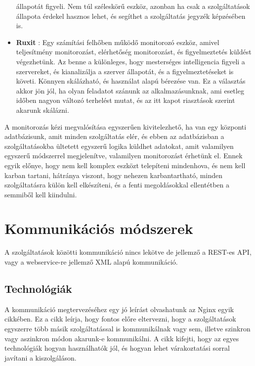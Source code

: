 \documentclass[11pt,magyar,a4paper,twoside,]{report}
\begin{document}
\begin{itemize}
  állapotát figyeli. Nem túl széleskörű eszköz, azonban ha csak a
  szolgáltatások állapota érdekel hasznos lehet, és segíthet a
  szolgáltatás jegyzék képzésében is.
\item
  \textbf{Ruxit}\citep{ruxit} \citep{ruxit-monitoring}: Egy számítási
  felhőben működő monitorozó eszköz, amivel teljesítmény monitorozást,
  elérhetőség monitorozást, és figyelmeztetés küldést végezhetünk. Az
  benne a különleges, hogy mesterséges intelligencia figyeli a
  szervereket, és kianalizálja a szerver állapotát, és a
  figyelmeztetéseket is követi. Könnyen skálázható, és használat alapú
  bérezése van. Ez a választás akkor jön jól, ha olyan feladatot szánunk
  az alkalmazásunknak, ami esetleg időben nagyon változó terhelést
  mutat, és az itt kapot riasztások szerint akarunk skálázni.
\end{itemize}

A monitorozás kézi megvalósítása egyszerűen kivitelezhető, ha van egy
központi adatbázisunk, amit minden szolgáltatás elér, és ebben az
adatbázisban a szolgáltatásokba ültetett egyszerű logika küldhet
adatokat, amit valamilyen egyszerű módszerrel megjelenítve, valamilyen
monitorozást érhetünk el. Ennek egyik előnye, hogy nem kell komplex
eszközt telepíteni mindenhova, és nem kell karban tartani, hátránya
viszont, hogy nehezen karbantartható, minden szolgáltatásra külön kell
elkészíteni, és a fenti megoldásokkal ellentétben a semmiből kell
kiindulni.

\section{Kommunikációs
módszerek}\label{kommunikuxe1ciuxf3s-muxf3dszerek}

A szolgáltatások közötti kommunikáció nincs lekötve de jellemző a
REST-es API, vagy a webservice-re jellemző XML alapú
kommunikáció\citep{rest-soap}.

\subsection{Technológiák}\label{technoluxf3giuxe1k}

A kommunikáció megtervezéséhez egy jó leírást olvashatunk az Nginx egyik
cikkében\citep{micro-communication}. Ez a cikk leírja, hogy fontos előre
eltervezni, hogy a szolgáltatások egyszerre több másik szolgáltatással
is kommunikálnak vagy sem, illetve szinkron vagy aszinkron módon
akarunk-e kommunikálni. A cikk kifejti, hogy az egyes technológiák
hogyan használhatók jól, és hogyan lehet várakoztatási sorral javítani a
kiszolgáláson.
\end{document}
